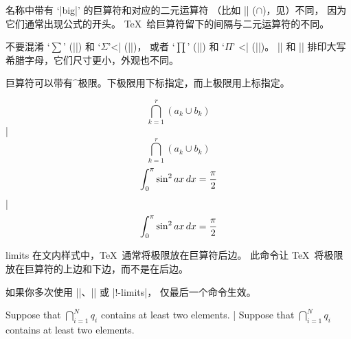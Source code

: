 名称中带有 `|big|' 的巨算符和对应的二元运算符%
（比如 |\cap| ($\cap$)，见）不同，
因为它们通常出现公式的开头。
\TeX\ 给巨算符留下的间隔与二元运算符的不同。

不要混淆 `$\sum$' (|\sum|) 和 `$\Sigma$'^^|\Sigma| (|\Sigma|)，
或者 `$\prod$' (|\prod|) 和 `$\Pi$' ^^|\Pi| (|\Pi|)。
|\Sigma| 和 |\Pi| 排印大写希腊字母，它们尺寸更小，外观也不同。

巨算符可以带有^{极限}。下极限用下标指定，而上极限用上标指定。

\example
$$\bigcap_{k=1}^r (a_k \cup b_k)$$
|
\dproduces
$$\bigcap_{k=1}^r (a_k \cup b_k)$$
\endexample
\interexampleskip
\example
$${\int_0^\pi \sin^2 ax\,dx} = {\pi \over 2}$$
|
\dproduces
$${\int_0^\pi \sin^2 ax\,dx} = {\pi \over 2}$$
\endexample
\enddesc

\begindesc
\cts limits {}
\explain
在文内样式中，\TeX\ 通常将极限放在巨算符后边。
此命令让 \TeX\ 将极限放在巨算符的上边和下边，而不是在后边。

如果你多次使用 |\limits|、|\nolimits| 或 |\display!-limits|，
仅最后一个命令生效。

\example
Suppose that $\bigcap\limits_{i=1}^Nq_i$ contains at least
two elements.
|
\produces
Suppose that $\bigcap\limits_{i=1}^Nq_i$ contains at least
two elements.
\endexample
\enddesc

